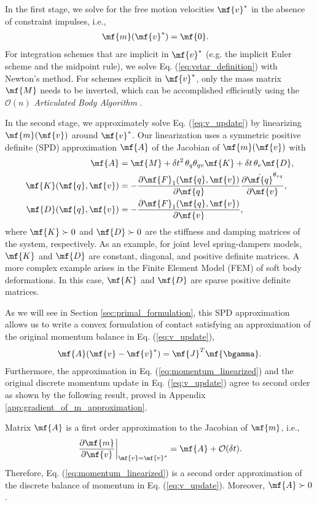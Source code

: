 In the first stage, we solve for the free motion velocities $\mf{v}^*$ in the
absence of constraint impulses, i.e.,
\begin{align}
	\mf{m}(\mf{v}^*) &= \mf{0}.
	\label{eq:vstar_definition}
\end{align}
For integration schemes that are implicit in $\mf{v}^*$ (e.g. the implicit Euler
scheme and the midpoint rule), we solve Eq. (\ref{eq:vstar_definition}) with
Newton's method. For schemes explicit in $\mf{v}^*$, only the mass matrix
$\mf{M}$ needs to be inverted, which can be accomplished efficiently using the
$\mathcal{O}(n)$ \emph{Articulated Body Algorithm}
\cite{bib:featherstone2008_rigid_body_dynamics_algorithms}.

In the second stage, we approximately solve Eq. (\ref{eq:v_update}) by
linearizing $\mf{m}(\mf{v})$ around $\mf{v}^*$. Our linearization uses a
symmetric positive definite (SPD) approximation $\mf{A}$ of the Jacobian of
$\mf{m}(\mf{v})$ with
\begin{align}
	\mf{A}&=\mf{M}+\delta t^2\,\theta_q\theta_{qv}\mf{K}+\delta t\,\theta_v\mf{D},
	\label{eq:expression_for_A}\\
	\mf{K}(\mf{q}, \mf{v})&=-\frac{\partial \mf{F}_1(\mf{q}, \mf{v})}{\partial
	\mf{q}}\frac{\partial\dot{\mf{q}}^{\theta_{vq}}}{\partial\mf{v}},
	\label{eq:stiffness_matrix}\\
	\mf{D}(\mf{q}, \mf{v})&=-\frac{\partial \mf{F}_1(\mf{q}, \mf{v})}{\partial
	\mf{v}},
	\label{eq:dissipation_matrix}
\end{align}
where $\mf{K} \succ 0$ and $\mf{D}\succ 0$ are the stiffness and damping
matrices of the system, respectively. As an example, for joint level
spring-dampers models, $\mf{K}$ and $\mf{D}$ are constant, diagonal, and
positive definite matrices. A more complex example arises in the Finite Element
Model (FEM) of soft body deformations. In this case, $\mf{K}$ and $\mf{D}$ are
sparse positive definite matrices.

As we will see in Section \ref{sec:primal_formulation}, this SPD approximation
allows us to write a convex formulation of contact satisfying an approximation
of the original momentum balance in Eq. (\ref{eq:v_update}),
\begin{align}
	\mf{A}(\mf{v}-\mf{v}^*) = \mf{J}^T\mf{\bgamma}.
	\label{eq:momentum_linearized}
\end{align}
Furthermore, the approximation in Eq. (\ref{eq:momentum_linearized}) and the
original discrete momentum update in Eq. (\ref{eq:v_update}) agree to second
order as shown by the following result, proved in Appendix
\ref{app:gradient_of_m_approximation}.
\begin{prop}	
Matrix $\mf{A}$ is a first order approximation to the Jacobian of $\mf{m}$,
i.e.,
\begin{align*}
	\left. \frac{\partial \mf{m}}{\partial \mf{v}} \right|_{\mf{v}=\mf{v}^*} = \mf{A} + \mathcal{O}(\delta t).
\end{align*}
Therefore, Eq. (\ref{eq:momentum_linearized}) is a second order approximation of
the discrete balance of momentum in Eq. (\ref{eq:v_update}). Moreover, $\mf{A}
\succ 0$.
\label{prop:gradient_of_m_approximation}
\end{prop}

